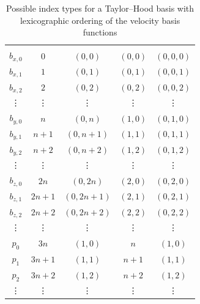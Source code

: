 \documentclass[a4paper,10pt,headings=normal,bibliography=totoc]{scrartcl}
\begin{document}
\begin{table}
 \begin{center}
 \begin{tabular}{c|c|c|c|c}
 \hline \\
  $b_{x,0}$  & $0$    & $(0,0)$ & $(0,0)$ & $(0,0,0)$ \\
  $b_{x,1}$  & $1$    & $(0,1)$ & $(0,1)$ & $(0,0,1)$ \\
  $b_{x,2}$  & $2$    & $(0,2)$ & $(0,2)$ & $(0,0,2)$ \\
    \vdots   & \vdots & \vdots  & \vdots  & \vdots  \\
  $b_{y,0}$  & $n$    & $(0,n)$ & $(1,0)$ & $(0,1,0)$ \\
  $b_{y,1}$  & $n+1$  & $(0,n+1)$ & $(1,1)$ & $(0,1,1)$ \\
  $b_{y,2}$  & $n+2$  & $(0,n+2)$ & $(1,2)$ & $(0,1,2)$ \\
    \vdots   & \vdots & \vdots  & \vdots  & \vdots  \\
  $b_{z,0}$  & $2n$   & $(0,2n)$ & $(2,0)$ & $(0,2,0)$ \\
  $b_{z,1}$  & $2n+1$ & $(0,2n+1)$ & $(2,1)$ & $(0,2,1)$ \\
  $b_{z,2}$  & $2n+2$ & $(0,2n+2)$ & $(2,2)$ & $(0,2,2)$ \\
    \vdots   & \vdots & \vdots  & \vdots  & \vdots  \\
  $p_0$      & $3n$   & $(1,0)$ & $n$ & $(1,0)$ \\
  $p_1$      & $3n+1$ & $(1,1)$ & $n+1$ & $(1,1)$ \\
  $p_2$      & $3n+2$ & $(1,2)$ & $n+2$ & $(1,2)$ \\
    \vdots   & \vdots & \vdots  & \vdots  & \vdots
 \end{tabular}
 \end{center}
 \caption{Possible index types for a Taylor--Hood basis with lexicographic ordering of the velocity basis functions}
 \label{tbl:dune_functions:th_multiindices_lexicographic}
\end{table}
\end{document}
